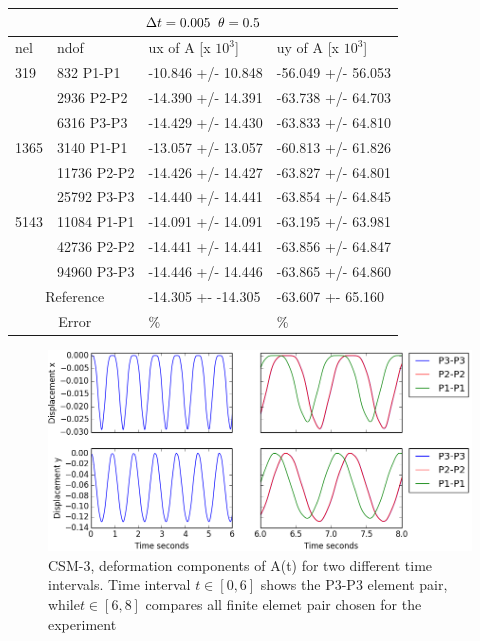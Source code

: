 \begin{table}[h!]
\centering
\label{CSM 3 Results 3}
\begin{tabular}{ |p{1cm}||p{2.7cm}|p{3.3cm}|p{3.3cm}|}
\hline
  \multicolumn{4}{|c|}{$\Delta t = 0.005 \hspace{2mm} \theta = 0.5$} \\
\hline
nel & ndof & ux of A [x $10^{3}$]  &uy of A [x $10^{3}$] \\
\hline
    319     & 832 P1-P1 & -10.846       +/-  10.848 & -56.049       +/-  56.053 \\
     & 2936 P2-P2  & -14.390       +/-  14.391 & -63.738       +/-  64.703 \\
      & 6316 P3-P3 & -14.429       +/-  14.430 & -63.833       +/-  64.810 \\
 \hline 
    1365    & 3140 P1-P1 & -13.057       +/-  13.057 & -60.813       +/-  61.826 \\
     & 11736 P2-P2& -14.426       +/-  14.427 & -63.827       +/-  64.801 \\
     & 25792 P3-P3 & -14.440       +/-  14.441 & -63.854       +/-  64.845 \\
 \hline
      5143    & 11084 P1-P1 & -14.091       +/-  14.091 & -63.195       +/-  63.981 \\
     & 42736 P2-P2 & -14.441       +/-  14.441 & -63.856       +/-  64.847 \\
     & 94960 P3-P3 & -14.446       +/-  14.446 & -63.865       +/-  64.860 \\
 \hline
  \multicolumn{2}{|c|}{Reference}  &-14.305 +- -14.305        & -63.607 +- 65.160    \\
   \hline
    \multicolumn{2}{|c|}{Error}  & \%   &  \%\\
   \hline
\end{tabular}
\end{table}

\begin{figure}[h!]
  \centering
    \includegraphics[scale=0.6]{./Fig/csm3compare.png}
      \caption{CSM-3, deformation components of A(t) for two different time intervals. Time interval $t \in [0, 6]$ shows the P3-P3 element pair, while$t \in [6, 8]$ compares all finite elemet pair chosen for the experiment}
\end{figure}

